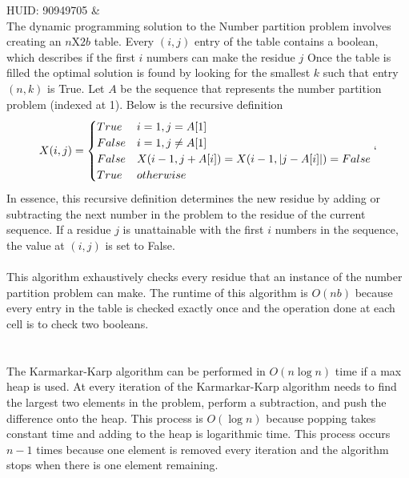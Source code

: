 \documentclass[11pt]{article}
\begin{document}
	\noindent HUID: 90949705 \& \\
	\vspace{.2in}
	The dynamic programming solution to the Number partition problem involves creating an $n$X$2b$ table. Every $(i,j)$ entry of the table contains a boolean, which describes if the first $i$ numbers can make the residue $j$  Once the table is filled the optimal solution is found by looking for the smallest $k$ such that entry $(n,k)$ is True. Let $A$ be the sequence that represents the number partition problem (indexed at 1). Below is the recursive definition
	\[X(i,j) = 
	\begin{cases}
	 True & i = 1, j = A[1]\\
	 False & i = 1, j \neq A[1] \\ 
	 False & X(i-1, j + A[i]) = X(i-1, |j - A[i]|) = False \\
	 True & otherwise
	\end{cases}`
	\]
	In essence, this recursive definition determines the new residue by adding or subtracting the next number in the problem to the residue of the current sequence. If a residue $j$ is unattainable with the first $i$ numbers in the sequence, the value at $(i,j)$ is set to False. \\\\
	This algorithm exhaustively checks every residue that an instance of the number partition problem can make. The runtime of this algorithm is $O(nb)$ because every entry in the table is checked exactly once and the operation done at each cell is to check two booleans.\\\\\\
	The Karmarkar-Karp algorithm can be performed in $O(n\log n)$ time if a max heap is used. At every iteration of the Karmarkar-Karp algorithm needs to find the largest two elements in the problem, perform a subtraction, and push the difference onto the heap. This process is $O(\log n)$ because popping takes constant time and adding to the heap is logarithmic time. This process occurs $n-1$ times because one element is removed every iteration and the algorithm stops when there is one element remaining.
\end{document}
